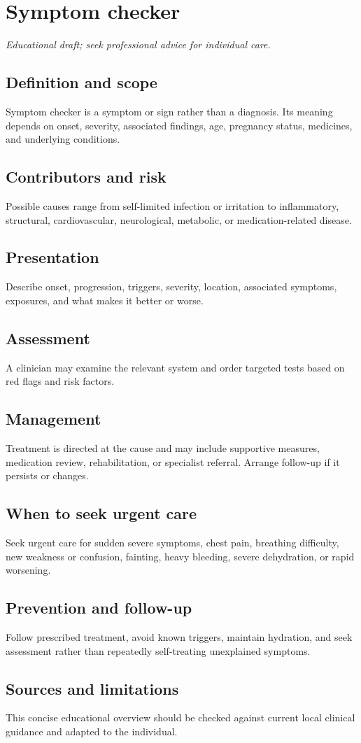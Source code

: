 \chapter{Symptom checker}
\medskip
\noindent\textit{Educational draft; seek professional advice for individual care.}

\section*{Definition and scope}
Symptom checker is a symptom or sign rather than a diagnosis. Its meaning depends on onset, severity, associated findings, age, pregnancy status, medicines, and underlying conditions.

\section*{Contributors and risk}
Possible causes range from self-limited infection or irritation to inflammatory, structural, cardiovascular, neurological, metabolic, or medication-related disease.

\section*{Presentation}
Describe onset, progression, triggers, severity, location, associated symptoms, exposures, and what makes it better or worse.

\section*{Assessment}
A clinician may examine the relevant system and order targeted tests based on red flags and risk factors.

\section*{Management}
Treatment is directed at the cause and may include supportive measures, medication review, rehabilitation, or specialist referral. Arrange follow-up if it persists or changes.

\section*{When to seek urgent care}
Seek urgent care for sudden severe symptoms, chest pain, breathing difficulty, new weakness or confusion, fainting, heavy bleeding, severe dehydration, or rapid worsening.

\section*{Prevention and follow-up}
Follow prescribed treatment, avoid known triggers, maintain hydration, and seek assessment rather than repeatedly self-treating unexplained symptoms.

\section*{Sources and limitations}
This concise educational overview should be checked against current local clinical guidance and adapted to the individual.

